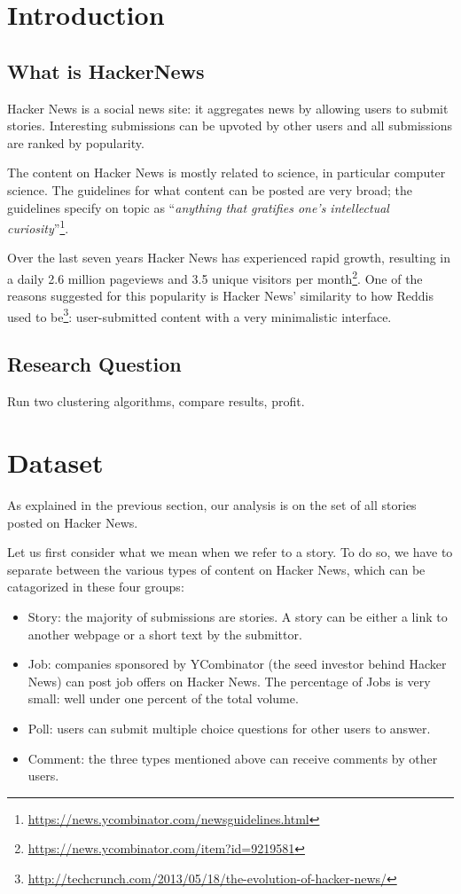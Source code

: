 \section{Introduction}
\subsection{What is HackerNews}
Hacker News is a social news site: it aggregates news by allowing users to submit stories. Interesting submissions can be upvoted by other users and all submissions are ranked by popularity.

The content on Hacker News is mostly related to science, in particular computer science. The guidelines for what content can be posted are very broad; the guidelines specify on topic as ``\textit{anything that gratifies one's intellectual curiosity}''\footnote{\url{https://news.ycombinator.com/newsguidelines.html}}.

Over the last seven years Hacker News has experienced rapid growth, resulting in a daily 2.6 million pageviews and 3.5 unique visitors per month\footnote{\url{https://news.ycombinator.com/item?id=9219581}}. One of the reasons suggested for this popularity is Hacker News' similarity to how Reddis used to be\footnote{\url{http://techcrunch.com/2013/05/18/the-evolution-of-hacker-news/}}: user-submitted content with a very minimalistic interface.

\subsection{Research Question}
Run two clustering algorithms, compare results, profit.

\lipsum[1-1]

\section{Dataset}
As explained in the previous section, our analysis is on the set of all stories posted on Hacker News. 

Let us first consider what we mean when we refer to a story. To do so, we have to separate between the various types of content on Hacker News, which can be catagorized in these four groups:
\begin{itemize}
\item Story: the majority of submissions are stories. A story can be either a link to another webpage or a short text by the submittor.
\item Job: companies sponsored by YCombinator (the seed investor behind Hacker News) can post job offers on Hacker News. The percentage of Jobs is very small: well under one percent of the total volume.
\item Poll: users can submit multiple choice questions for other users to answer.
\item Comment: the three types mentioned above can receive comments by other users.
\end{itemize}

